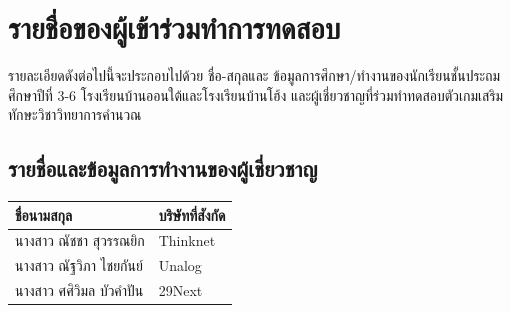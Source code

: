\chapter{รายชื่อของผู้เข้าร่วมทำการทดสอบ}
รายละเอียดดังต่อไปนี้จะประกอบไปด้วย ชื่อ-สกุลและ ข้อมูลการศึกษา/ทำงานของนักเรียนชั้นประถมศึกษาปีที่ 3-6 โรงเรียนบ้านออนใต้และโรงเรียนบ้านโฮ้ง และผู้เชี่ยวชาญที่ร่วมทำทดสอบตัวเกมเสริมทักษะวิชาวิทยาการคำนวณ
\section{รายชื่อและข้อมูลการทำงานของผู้เชี่ยวชาญ}
\begin{center}
    \begin{tabular}{ |p{5cm}|p{5cm}| }
        \hline
        ชื่อนามสกุล & บริษัทที่สังกัด\\
        \hline
        นางสาว ณัชชา สุวรรณยิก & Thinknet\\
        \hline
        นางสาว ณัฐวิภา ไชยกันย์ & Unalog\\
        \hline
        นางสาว ศศิวิมล บัวคำปัน & 29Next\\
        \hline
    \end{tabular}
\end{center}
